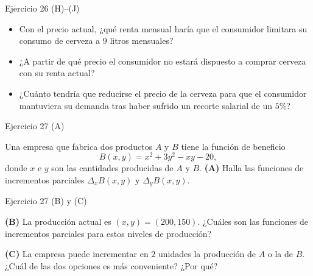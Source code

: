 \documentclass[aspectratio=169]{beamer}
\begin{document}
\begin{frame}{Ejercicio 26 (H)–(J)}
  \begin{mwejercicio}
    \begin{itemize}
      \item[\textbf{(H)}] Con el precio actual, ¿qué renta mensual haría que el
      consumidor limitara su consumo de cerveza a \(9\) litros mensuales?
      \item[\textbf{(I)}] ¿A partir de qué precio el consumidor no estará
      dispuesto a comprar cerveza con su renta actual?
      \item[\textbf{(J)}] ¿Cuánto tendría que reducirse el precio de la cerveza
      para que el consumidor mantuviera su demanda tras haber sufrido un
      recorte salarial de un \(5\%\)?
    \end{itemize}
  \end{mwejercicio}
\end{frame}

\begin{frame}{Ejercicio 27 (A)}
  \begin{mwejercicio}
    Una empresa que fabrica dos productos \(A\) y \(B\) tiene la función de
    beneficio
    \[
      B(x,y)=x^{2}+3y^{2}-xy-20,
    \]
    donde \(x\) e \(y\) son las cantidades producidas de \(A\) y \(B\).
    \textbf{(A)} Halla las funciones de incrementos parciales
    \(\Delta_x B(x,y)\) y \(\Delta_y B(x,y)\).
  \end{mwejercicio}
\end{frame}

\begin{frame}{Ejercicio 27 (B) y (C)}
  \begin{mwejercicio}
    \textbf{(B)} La producción actual es \((x,y)=(200,150)\). ¿Cuáles son las
    funciones de incrementos parciales para estos niveles de producción?

    \textbf{(C)} La empresa puede incrementar en \(2\) unidades la producción de
    \(A\) o la de \(B\). ¿Cuál de las dos opciones es más conveniente? ¿Por qué?
  \end{mwejercicio}
\end{frame}
\end{document}
